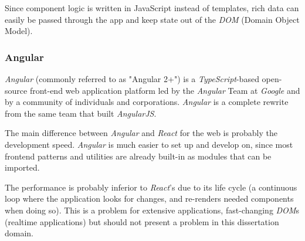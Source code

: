 Since component logic is written in JavaScript instead of templates, rich data can easily be passed through the app and keep state out of the \textit{DOM} (Domain Object Model).

\subsubsection{Angular}

\emph{Angular} (commonly referred to as "Angular 2+") is a \emph{TypeScript}-based open-source front-end web application platform led by the \emph{Angular} Team at \emph{Google} and by a community of individuals and corporations. \emph{Angular} is a complete rewrite from the same team that built \emph{AngularJS}.

The main difference between \emph{Angular} and \emph{React} for the web is probably the development speed. \emph{Angular} is much easier to set up and develop on, since most frontend patterns and utilities are already built-in as modules that can be imported. 

The performance is probably inferior to \emph{React}'s due to its life cycle (a continuous loop where the application looks for changes, and re-renders needed components when doing so). This is a problem for extensive applications, fast-changing \emph{DOM}s (realtime applications) but should not present a problem in this dissertation domain.


